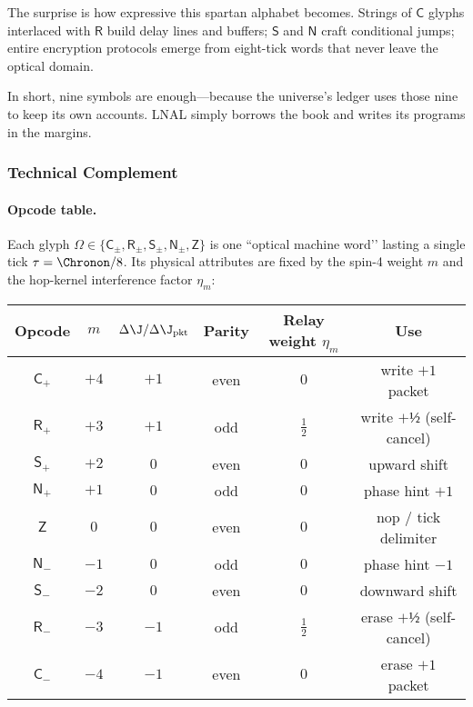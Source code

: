 \documentclass[11pt,oneside]{book}
\begin{document}
The surprise is how expressive this spartan alphabet becomes.  
Strings of $\mathsf{C}$ glyphs interlaced with $\mathsf{R}$ build
delay lines and buffers; $\mathsf{S}$ and $\mathsf{N}$ craft
conditional jumps; entire encryption protocols emerge from eight-tick
words that never leave the optical domain.  

In short, nine symbols are enough—because the universe’s ledger uses
those nine to keep its own accounts.  
LNAL simply borrows the book and writes its programs in the margins.



\subsubsection*{Technical Complement}

\paragraph{Opcode table.}
Each glyph \(\Omega\in\{\mathsf{C_{\pm}},\mathsf{R_{\pm}},
\mathsf{S_{\pm}},\mathsf{N_{\pm}},\mathsf{Z}\}\) is one
“optical machine word’’ lasting a single tick
\(\tau = \Chronon/8\).
Its physical attributes are fixed by the spin-4 weight \(m\) and the
hop-kernel interference factor \(\eta_{m}\):

\begin{center}\small
\begin{tabular}{cccccc}
\toprule
Opcode & $m$ & $\Delta\J/\Delta\J_{\text{pkt}}$ & Parity
& Relay weight $\eta_{m}$ & Use \\ \midrule
$\mathsf{C_{+}}$ & $+4$ & $+1$ & even & $0$        & write $+1$ packet\\
$\mathsf{R_{+}}$ & $+3$ & $+1$ & odd  & $\tfrac12$ & write $+½$ (self-cancel)\\
$\mathsf{S_{+}}$ & $+2$ & $0$  & even & $0$        & upward shift\\
$\mathsf{N_{+}}$ & $+1$ & $0$  & odd  & $0$        & phase hint $+1$\\ \midrule
$\mathsf{Z}$     & $0$  & $0$  & even & $0$        & nop / tick delimiter\\ \midrule
$\mathsf{N_{-}}$ & $-1$ & $0$  & odd  & $0$        & phase hint $-1$\\
$\mathsf{S_{-}}$ & $-2$ & $0$  & even & $0$        & downward shift\\
$\mathsf{R_{-}}$ & $-3$ & $-1$ & odd  & $\tfrac12$ & erase $+½$ (self-cancel)\\
$\mathsf{C_{-}}$ & $-4$ & $-1$ & even & $0$        & erase $+1$ packet \\ \bottomrule
\end{tabular}
\end{center}
\end{document}
